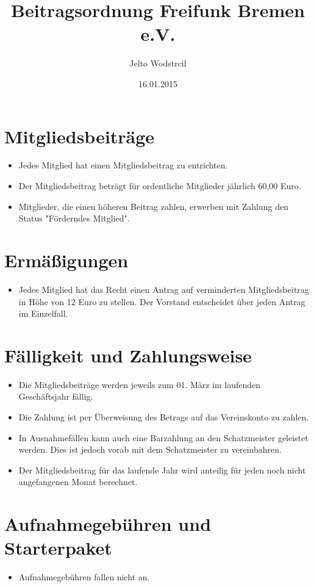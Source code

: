 \documentclass[a4paper,10pt]{article}
\title{Beitragsordnung Freifunk Bremen e.V.}
\author{Jelto Wodstrcil}
\date{16.01.2015}
\begin{document}
\maketitle

\section{Mitgliedsbeiträge}
\begin{itemize}
 \item Jedes Mitglied hat einen Mitgliedsbeitrag zu entrichten.
 \item Der Mitgliedsbeitrag beträgt für ordentliche Mitglieder jährlich 60,00 Euro.
 \item Mitglieder, die einen höheren Beitrag zahlen, erwerben mit Zahlung den Status "Förderndes Mitglied".
\end{itemize}

\section{Ermäßigungen}
\begin{itemize}
 \item Jedes Mitglied hat das Recht einen Antrag auf verminderten Mitgliedsbeitrag in Höhe von 12 Euro zu stellen. Der Vorstand entscheidet über jeden Antrag im Einzelfall. 
\end{itemize}

\section{Fälligkeit und Zahlungsweise}
\begin{itemize}
 \item Die Mitgliedsbeiträge werden jeweils zum 01. März im laufenden Geschäftsjahr fällig.
 \item Die Zahlung ist per Überweisung des Betrags auf das Vereinskonto zu zahlen. 
 \item In Ausnahmefällen kann auch eine Barzahlung an den Schatzmeister geleistet werden. Dies ist jedoch vorab mit dem Schatzmeister zu vereinbahren. 
 \item Der Mitgliedsbeitrag für das laufende Jahr wird anteilig für jeden noch nicht angefangenen Monat berechnet. 
 \end{itemize}

\section{Aufnahmegebühren und Starterpaket}
\begin{itemize}
 \item Aufnahmegebühren fallen nicht an.
\end{itemize}
\end{document}

